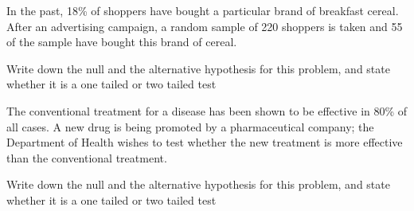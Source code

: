 
\item 
In the past, 18\% of shoppers have bought a particular brand of breakfast cereal.
After an advertising campaign, a random sample of 220 shoppers is taken and 55 of the sample have bought this brand of cereal.

Write down the null and the alternative hypothesis for this problem, and state whether it is a one tailed or two tailed test

The conventional treatment for a disease has been shown to be effective in
80\% of all cases. A new drug is being promoted by a pharmaceutical
company; the Department of Health wishes to test whether the new treatment
is more effective than the conventional treatment.

Write down the null and the alternative hypothesis for this problem, and state whether it is a one tailed or two tailed test

